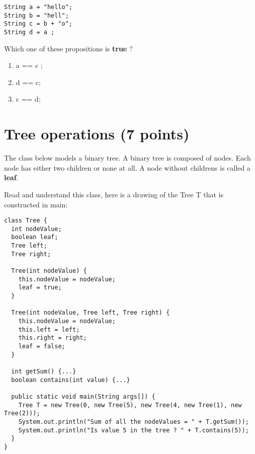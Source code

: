 \documentclass[correction]{exercices}
\begin{document}
\begin{question} \hfill
\begin{verbatim}
String a = "hello";
String b = "hell";
String c = b + "o";
String d = a ;
\end{verbatim}

Which one of these propositions is \textbf{true} ?

\begin{multicols}{2}
\begin{enumerate}
\item a == c 
;
\item d == c;
\item c == d;
\end{enumerate}
\end{multicols}
\end{question}

\pagebreak
\section{Tree operations (7 points)}

The class below models a binary tree. 
A binary tree is composed of nodes.
Each node has either two children or none at all.
A node without childrens is called a \textbf{leaf}.

Read and understand this class,  here is a drawing of the
Tree T that is constructed in main:
\begin{figure}[h]
\end{figure}

\begin{verbatim}
class Tree {
  int nodeValue;
  boolean leaf;
  Tree left;
  Tree right;

  Tree(int nodeValue) {
    this.nodeValue = nodeValue;
    leaf = true;
  }

  Tree(int nodeValue, Tree left, Tree right) {
    this.nodeValue = nodeValue;
    this.left = left;
    this.right = right;
    leaf = false;
  }

  int getSum() {...}
  boolean contains(int value) {...}

  public static void main(String args[]) {
    Tree T = new Tree(0, new Tree(5), new Tree(4, new Tree(1), new Tree(2)));
    System.out.println("Sum of all the nodeValues = " + T.getSum());
    System.out.println("Is value 5 in the tree ? " + T.contains(5));
  }
}
\end{verbatim}
\end{document}
